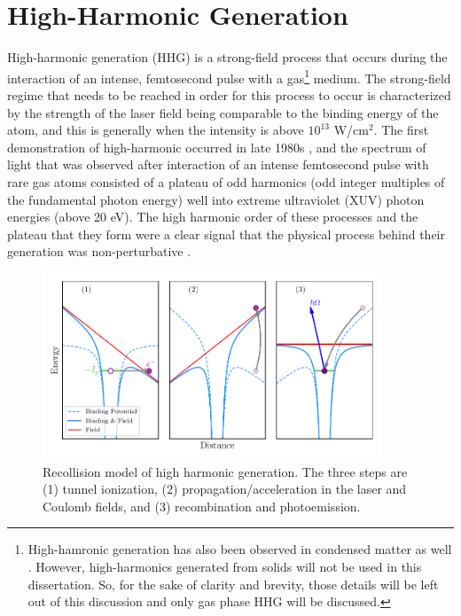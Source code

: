\section{High-Harmonic Generation}
\label{intro_HHG}


High-harmonic generation (HHG) is a strong-field process that occurs during the interaction of an intense, femtosecond pulse with a gas\footnote{High-hamronic generation has also been observed in condensed matter as well \cite{ghimireObservationHighorderHarmonic2011}. However, high-harmonics generated from solids will not be used in this dissertation.  So, for the sake of clarity and brevity, those details will be left out of this discussion and only gas phase HHG will be discussed.} medium.  The strong-field regime that needs to be reached in order for this process to occur is characterized by the strength of the laser field being comparable to the binding energy of the atom, and this is generally when the intensity is above $10^{13}$ W/cm$^{2}$.  The first demonstration of high-harmonic occurred in late 1980s \cite{mcphersonStudiesMultiphotonProduction1987, liMultipleharmonicGenerationRare1989}, and the spectrum of light that was observed after interaction of an intense femtosecond pulse with rare gas atoms consisted of a plateau of odd harmonics (odd integer multiples of the fundamental photon energy) well into extreme ultraviolet (XUV) photon energies (above 20 eV).  The high harmonic order of these processes and the plateau that they form were a clear signal that the physical process behind their generation was non-perturbative \cite{boydNonlinearOptics2008}.  

\begin{figure}
	\centering
	\includegraphics[width=0.9\textwidth]{figures/Introduction/3-step.pdf}
	\caption[Recollision model of high harmonic generation]{Recollision model of high harmonic generation.  The three steps are (1) tunnel ionization, (2) propagation/acceleration in the laser and Coulomb fields, and (3) recombination and photoemission.}
	\label{fig:3-step}
\end{figure}


